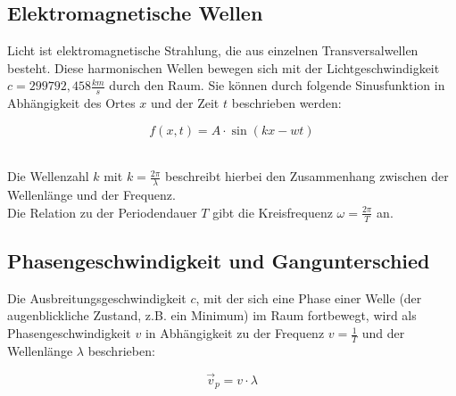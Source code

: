 \documentclass[12pt,a4paper,titlepage,headinclude,bibtotoc]{scrartcl}
\begin{document}
\subsection{Elektromagnetische Wellen}
Licht ist elektromagnetische Strahlung, die aus einzelnen Transversalwellen besteht. Diese harmonischen Wellen bewegen sich mit der Lichtgeschwindigkeit $c= 299 792,458 \frac{km}{s}$ durch den Raum. Sie können durch folgende Sinusfunktion in Abhängigkeit des Ortes $x$ und der Zeit $t$ beschrieben werden:
\\
\par %
\begin{equation}
f(x,t)={ A}\cdot{\sin(kx-wt)}
\end{equation}
\\
\par

Die Wellenzahl $k$ mit $k=\frac{2\pi}{\lambda}$ beschreibt hierbei den Zusammenhang zwischen der Wellenlänge und der Frequenz. \\
Die Relation zu der Periodendauer $T$ gibt die Kreisfrequenz $\omega =\frac{2\pi}{T} $ an.  








\subsection{Phasengeschwindigkeit und Gangunterschied}
Die Ausbreitungsgeschwindigkeit $c$, mit der sich eine Phase einer Welle (der augenblickliche Zustand, z.B. ein Minimum) im Raum fortbewegt, wird als Phasengeschwindigkeit $v$ in Abhängigkeit zu der Frequenz $v=\frac{1}{T}$ und der Wellenlänge $\lambda$ beschrieben:\\
\par
\begin{equation}
\vec{v}_p = {v}\cdot{\lambda}
\end{equation}
\\
\par
\end{document}
